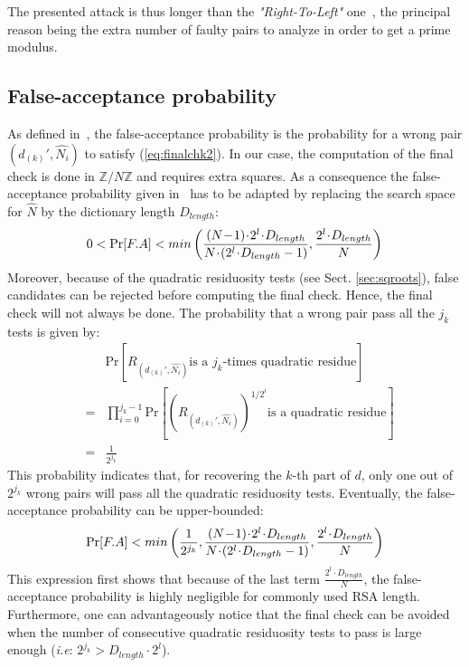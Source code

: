 \documentclass{article}
\begin{document}
The presented attack is thus longer than the
\textit{"Right-To-Left"} one~\cite{77}, the principal reason being
the extra number of faulty pairs to analyze in order to get a prime modulus.

\subsection{False-acceptance probability}
\label{sec:proba}
As defined in~\cite{77}, the false-acceptance probability is the probability for a wrong pair $(d_{(k)}',\hat{N_i})$ to satisfy (\ref{eq:finalchk2}). In our case, the computation of the final check is done in $\mathbb{Z}/N\mathbb{Z}$ and requires extra squares. As a consequence the false-acceptance probability given in~\cite{77} has to be adapted by replacing the search space for $\hat{N}$ by the dictionary length $D_{length}$: 
\begin{equation}
 0 < \mbox{Pr}[F.A] <	min\left(\frac{(N\!-\!1)\!\cdot\!2^{l}\!\cdot\!D_{length}}
				      {N\!\cdot\!(2^{l}\!\cdot\!D_{length}-1)},\\
			\frac{2^{l}\!\cdot\!D_{length}}{N}\right)
\end{equation}
Moreover, because of the quadratic residuosity tests (see Sect. \ref{sec:sqroots}), false candidates can be rejected before computing the final check. Hence, the final check will not always be done. The probability that a wrong pair pass all the $j_k$ tests is given by:
\begin{eqnarray}
 &   & \mbox{Pr}\left[ R_{(d_{(k)}',\hat{N_i})} \mbox{is a } j_k\mbox{-times quadratic residue}\right]\\
 \nonumber
 & = & \prod_{i=0}^{j_k-1}\mbox{Pr} \left[ {\left(R_{(d_{(k)}',\hat{N_i})}\right)}^{1/2^i}
					     \mbox{is a quadratic residue} \right]\\ \nonumber
 & = & \frac{1}{2^{j_k}} 
\end{eqnarray}
This probability indicates that, for recovering the $k$-th part of $d$, only one out of $2^{j_k}$ wrong pairs will pass all the quadratic residuosity tests. Eventually, the false-acceptance probability can be upper-bounded:
\begin{equation}
     \mbox{Pr}[F.A] < min \left(\frac{1}{2^{j_k}}, \frac{(N\!-\!1)\!\cdot\!2^{l}\!\cdot\!D_{length}}
				      {N\!\cdot\!(2^{l}\!\cdot\!D_{length}-1)},\\
			\frac{2^{l}\!\cdot\!D_{length}}{N}\right)
\end{equation}
This expression first shows that because of the last term $\frac{2^{l}\!\cdot\!D_{length}}{N}$, the false-acceptance probability is highly negligible for commonly used RSA length. Furthermore, 
one can advantageously notice that the final check can be avoided when the number of consecutive quadratic residuosity tests to pass is large enough (\textit{i.e}: $2^{j_{k}} > D_{length} \cdot 2^{l}$).
\end{document}
